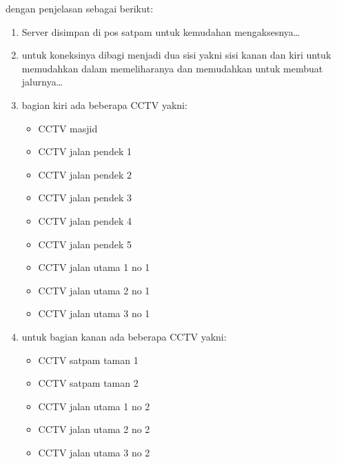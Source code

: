 \documentclass[a4paper, 12pt]{article}
\begin{document}
dengan penjelasan sebagai berikut:
\begin{enumerate}
  \item Server disimpan di pos satpam untuk kemudahan mengaksesnya\dots
  \item untuk koneksinya dibagi menjadi dua sisi yakni sisi kanan dan kiri untuk memudahkan dalam memeliharanya dan memudahkan untuk membuat jalurnya\dots
  \item bagian kiri ada beberapa CCTV yakni:
    \begin{itemize}
      \item CCTV masjid
      \item CCTV jalan pendek 1
      \item CCTV jalan pendek 2
      \item CCTV jalan pendek 3
      \item CCTV jalan pendek 4
      \item CCTV jalan pendek 5
      \item CCTV jalan utama 1 no 1
      \item CCTV jalan utama 2 no 1
      \item CCTV jalan utama 3 no 1
    \end{itemize}
  \item untuk bagian kanan ada beberapa CCTV yakni:
    \begin{itemize}
      \item CCTV satpam taman 1
      \item CCTV satpam taman 2
      \item CCTV jalan utama 1 no 2
      \item CCTV jalan utama 2 no 2
      \item CCTV jalan utama 3 no 2
    \end{itemize}
\end{enumerate}
\end{document}
